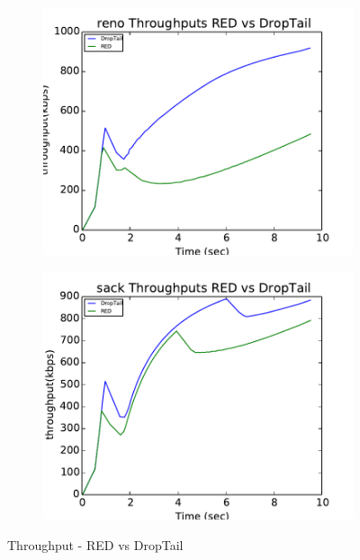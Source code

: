 \documentclass[USenglish,oneside,twocolumn]{article}
\begin{document}
\begin{figure}
\captionsetup{justification=centering}
    \centering
    \begin{subfigure}{0.5\linewidth}
        \centering
        \includegraphics[width=\linewidth]{fig/Reno_throughput_RED_DT.pdf} %
    \end{subfigure}
    \begin{subfigure}{0.48\linewidth}
        \centering
        \includegraphics[width=\linewidth]{fig/Sack_throughput_RED_DT.pdf} %
    \end{subfigure}
\caption{Throughput - RED vs DropTail}
\label{red_vs_dt}
\end{figure}
\end{document}
